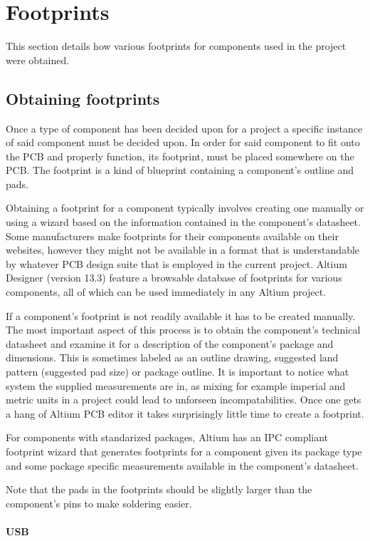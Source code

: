 \section{Footprints} \label{pcb:footprints}
This section details how various footprints for components used in the project were obtained.

\subsection{Obtaining footprints}
Once a type of component has been decided upon for a project a specific instance of said component must be decided upon.
In order for said component to fit onto the PCB and properly function, its footprint, must be placed somewhere on the PCB.
The footprint is a kind of blueprint containing a component's outline and pads.

Obtaining a footprint for a component typically involves creating one manually or using a wizard based on the information contained in the component's datasheet.
Some manufacturers make footprints for their components available on their websites, however they might not be available in a format that is understandable by whatever PCB design suite that is employed in the current project.
Altium Designer (version 13.3) feature a browsable database of footprints for various components, all of which can be used immediately in any Altium project.

If a component's footprint is not readily available it has to be created manually.
The most important aspect of this process is to obtain the component's technical datasheet and examine it for a description of the component's package and dimensions.
This is sometimes labeled as an outline drawing, suggested land pattern (suggested pad size) or package outline.
It is important to notice what system the supplied measurements are in, as mixing for example imperial and metric units in a project could lead to unforseen incompatabilities.
Once one gets a hang of Altium PCB editor it takes surprisingly little time to create a footprint.

For components with standarized packages, Altium has an IPC compliant footprint wizard that generates footprints for a component given its package type and some package specific measurements available in the component's datasheet.

Note that the pads in the footprints should be slightly larger than the component's pins to make soldering easier.

\paragraph{USB}

